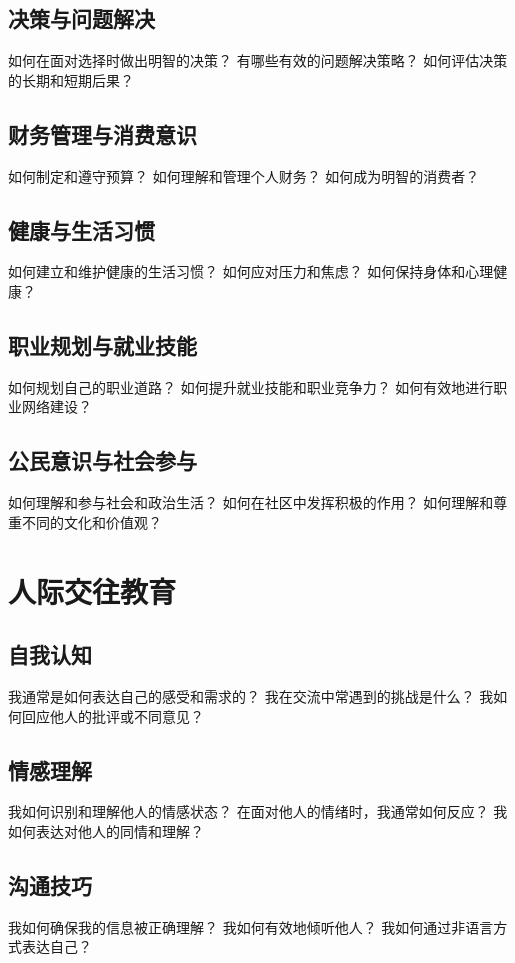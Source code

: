 \documentclass[12pt]{book}
\begin{document}
\subsection{决策与问题解决}
如何在面对选择时做出明智的决策？
有哪些有效的问题解决策略？
如何评估决策的长期和短期后果？

\subsection{财务管理与消费意识}
如何制定和遵守预算？
如何理解和管理个人财务？
如何成为明智的消费者？

\subsection{健康与生活习惯}
如何建立和维护健康的生活习惯？
如何应对压力和焦虑？
如何保持身体和心理健康？

\subsection{职业规划与就业技能}
如何规划自己的职业道路？
如何提升就业技能和职业竞争力？
如何有效地进行职业网络建设？

\subsection{公民意识与社会参与}
如何理解和参与社会和政治生活？
如何在社区中发挥积极的作用？
如何理解和尊重不同的文化和价值观？


\section{人际交往教育}
\subsection{自我认知}

我通常是如何表达自己的感受和需求的？
我在交流中常遇到的挑战是什么？
我如何回应他人的批评或不同意见？

\subsection{情感理解}
我如何识别和理解他人的情感状态？
在面对他人的情绪时，我通常如何反应？
我如何表达对他人的同情和理解？

\subsection{沟通技巧}
我如何确保我的信息被正确理解？
我如何有效地倾听他人？
我如何通过非语言方式表达自己？
\end{document}

